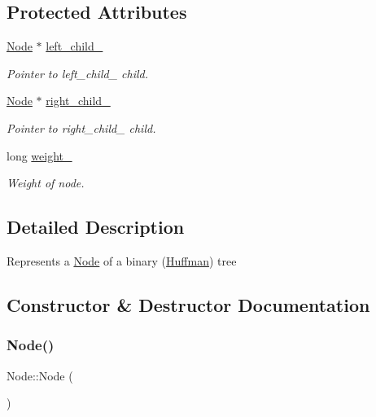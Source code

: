\subsection*{Protected Attributes}
\begin{DoxyCompactItemize}
\item 
\hyperlink{class_node}{Node} $\ast$ \hyperlink{class_node_a5ee0db484771d8654c32e7863fba292e}{left\+\_\+child\+\_\+}
\begin{DoxyCompactList}\small\item\em Pointer to left\+\_\+child\+\_\+ child. \end{DoxyCompactList}\item 
\hyperlink{class_node}{Node} $\ast$ \hyperlink{class_node_abf180145dff7ffce95b3b39bfe24d2f6}{right\+\_\+child\+\_\+}
\begin{DoxyCompactList}\small\item\em Pointer to right\+\_\+child\+\_\+ child. \end{DoxyCompactList}\item 
long \hyperlink{class_node_ae19ed1e78bfaf9ae1c33462d878116e2}{weight\+\_\+}
\begin{DoxyCompactList}\small\item\em Weight of node. \end{DoxyCompactList}\end{DoxyCompactItemize}


\subsection{Detailed Description}
Represents a \hyperlink{class_node}{Node} of a binary (\hyperlink{class_huffman}{Huffman}) tree 

\subsection{Constructor \& Destructor Documentation}
\mbox{\label{class_node_ad7a34779cad45d997bfd6d3d8043c75f}} 
\subsubsection{\texorpdfstring{Node()}{Node()}\hspace{0.1cm}{\footnotesize\ttfamily [1/2]}}
{\footnotesize\ttfamily Node\+::\+Node (\begin{DoxyParamCaption}{ }\end{DoxyParamCaption})}

